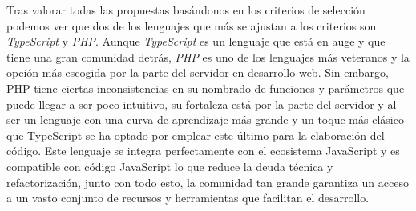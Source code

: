 Tras valorar todas las propuestas basándonos en los criterios de selección podemos ver que dos de los lenguajes que más se ajustan a los criterios son \textit{TypeScript} y \textit{PHP}. Aunque \textit{TypeScript} es un lenguaje que está en auge y que tiene una gran comunidad detrás, \textit{PHP} es uno de los lenguajes más veteranos y la opción más escogida por la parte del servidor en desarrollo web. Sin embargo, PHP tiene ciertas inconsistencias en su nombrado de funciones y parámetros que puede llegar a ser poco intuitivo, su fortaleza está por la parte del servidor y al ser un lenguaje con una curva de aprendizaje más grande y un toque más clásico que TypeScript se ha optado por emplear este último para la elaboración del código. Este lenguaje se integra perfectamente con el ecosistema JavaScript y es compatible con código JavaScript lo que reduce la deuda técnica y refactorización, junto con todo esto, la comunidad tan grande garantiza un acceso a un vasto conjunto de recursos y herramientas que facilitan el desarrollo.